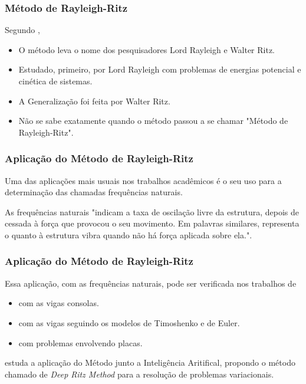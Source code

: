 \documentclass{beamer}
\begin{document}
	\begin{frame}
		\frametitle{Método de Rayleigh-Ritz}
		\justify
		
		Segundo , 
		\begin{itemize}
			\justifying
			\item O método leva o nome dos pesquisadores Lord Rayleigh e Walter Ritz.
			\pause
			\item Estudado, primeiro, por Lord Rayleigh com problemas de energias potencial e cinética de sistemas.
			\pause
			\item A Generalização foi feita por Walter Ritz.
			\pause
			\item Não se sabe exatamente quando o método passou a se chamar "Método de Rayleigh-Ritz".
		\end{itemize}
	\end{frame}
	
	\begin{frame}
		\frametitle{Aplicação do Método de Rayleigh-Ritz}
		\justify

		Uma das aplicações mais usuais nos trabalhos acadêmicos é o seu uso para a determinação das chamadas frequências naturais.
		\vspace{10pt}
		\pause
		
		As frequências naturais "indicam a taxa de oscilação livre da estrutura, depois de cessada à força que provocou o seu movimento. Em palavras similares, representa o quanto à estrutura vibra quando não há força aplicada sobre ela."\text{ }\cite[p. 1]{Vasquez2015}.
	\end{frame}
	
	\begin{frame}
		\frametitle{Aplicação do Método de Rayleigh-Ritz}
		\justify
		
		Essa aplicação, com as frequências naturais, pode ser verificada nos trabalhos de 
		\begin{itemize}
			\justifying
			\item {} com as vigas consolas.
			\item {} com as vigas seguindo os modelos de Timoshenko e de Euler.
			\item {} com problemas envolvendo placas.
		\end{itemize}
		\vspace{10pt}
		\pause
		
		 estuda a aplicação do Método junto a Inteligência Aritifical, propondo o método chamado de \textit{Deep Ritz Method} para a resolução de problemas variacionais.
	\end{frame}
	
\end{document}
